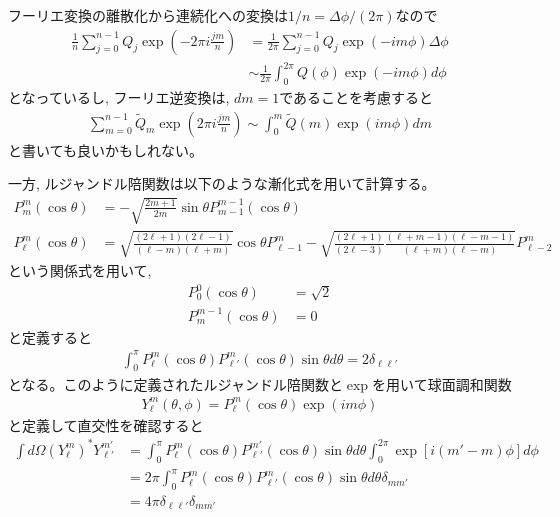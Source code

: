 \documentclass[a4j, 12pt]{ltjarticle}
\begin{document}
    フーリエ変換の離散化から連続化への変換は$1/n = \Delta \phi/(2\pi)$なので
    \begin{align}
        \frac{1}{n}\sum_{j=0}^{n-1}Q_j \exp\left(-2\pi i \frac{jm}{n}\right)
        &= \frac{1}{2\pi}\sum_{j=0}^{n-1}Q_j\exp\left(-im\phi \right) \Delta \phi \\
        &\sim \frac{1}{2\pi}\int_0^{2\pi} Q(\phi) \exp(-im\phi)d\phi
    \end{align}
    となっているし, フーリエ逆変換は, $dm = 1$であることを考慮すると
    \begin{align}
        \sum_{m=0}^{n-1}\tilde{Q}_m\exp\left(2\pi i \frac{jm}{n}\right) \sim
        \int_0^m \tilde{Q}(m) \exp\left(im\phi\right) dm
    \end{align}
    と書いても良いかもしれない。
    \par
    一方, ルジャンドル陪関数は以下のような漸化式を用いて計算する。
    \begin{align}
        P^m_m(\cos\theta) &= -\sqrt{\frac{2m+1}{2m}}\sin\theta P_{m-1}^{m-1}(\cos\theta) \\
        P^m_\ell (\cos\theta) &= \sqrt{\frac{(2\ell+1)(2\ell-1)}{(\ell - m)(\ell + m)}}\cos\theta P_{\ell-1}^m
        - \sqrt{\frac{(2\ell+1)}{(2\ell-3)}\frac{(\ell + m - 1)(\ell - m - 1)}{(\ell + m)(\ell - m)}}P_{\ell-2}^m
    \end{align}
    という関係式を用いて, 
    \begin{align}
        P_0^0(\cos\theta) &= \sqrt{2}\\
        P_m^{m-1}(\cos\theta) &= 0
    \end{align}
    と定義すると
    \begin{align}
        \int_0^\pi P_\ell^m(\cos\theta)P_{\ell'}^m(\cos\theta) \sin\theta d\theta = 2\delta_{\ell\ell'}
    \end{align}
    となる。このように定義されたルジャンドル陪関数と$\exp$を用いて球面調和関数
    \begin{align}
        Y_\ell^m(\theta,\phi) = P_\ell^m (\cos\theta)\exp(im\phi)
    \end{align}
    と定義して直交性を確認すると
    \begin{align}
        \int d\Omega (Y_\ell^m)^* Y_{\ell'}^{m'} &=
        \int_0^{\pi} P_\ell^m(\cos\theta)P_{\ell'}^{m'}(\cos\theta)\sin\theta d\theta 
        \int_0^{2\pi} \exp\left[i(m'-m)\phi\right] d\phi \nonumber\\
        &= 2\pi\int_0^{\pi} P_\ell^m(\cos\theta)P_{\ell'}^{m}(\cos\theta)\sin\theta d\theta \delta_{mm'} \nonumber\\
        & = 4\pi\delta_{\ell\ell'}\delta_{mm'}
    \end{align}
\end{document}
